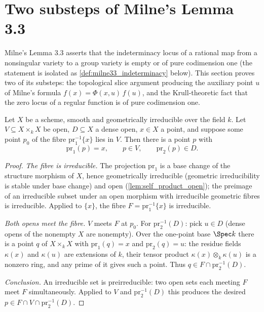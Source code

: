 \section{Two substeps of Milne's Lemma 3.3}
\label{sec:milne33_substeps}

Milne's Lemma 3.3 asserts that the indeterminacy locus of a rational map from a
nonsingular variety to a group variety is empty or of pure codimension one
(the statement is isolated as \ref{def:milne33_indeterminacy} below). This
section proves two of its substeps: the topological slice argument producing
the auxiliary point \(u\) of Milne's formula \(f(x) = \Phi(x,u)\,f(u)\), and
the Krull-theoretic fact that the zero locus of a regular function is of pure
codimension one.

\begin{theorem}
  \label{thm:fibre_slice_witness}
  \leanok
  Let \(X\) be a scheme, smooth and geometrically irreducible over the field
  \(k\). Let \(V \subseteq X \times_k X\) be open, \(D \subseteq X\) a dense
  open, \(x \in X\) a point, and suppose some point \(p_0\) of the fibre
  \(\mathrm{pr}_1^{-1}\{x\}\) lies in \(V\). Then there is a point \(p\) with
  \[
    \mathrm{pr}_1(p) = x, \qquad p \in V, \qquad \mathrm{pr}_2(p) \in D .
  \]
\end{theorem}
\begin{proof}
  \leanok
  \emph{The fibre is irreducible.} The projection \(\mathrm{pr}_1\) is a base
  change of the structure morphism of \(X\), hence geometrically irreducible
  (geometric irreducibility is stable under base change) and open
  (\ref{lem:self_product_open}); the preimage of an irreducible subset under an
  open morphism with irreducible geometric fibres is irreducible. Applied to
  \(\{x\}\), the fibre \(F = \mathrm{pr}_1^{-1}\{x\}\) is irreducible.

  \emph{Both opens meet the fibre.} \(V\) meets \(F\) at \(p_0\). For
  \(\mathrm{pr}_2^{-1}(D)\): pick \(u \in D\) (dense opens of the nonempty
  \(X\) are nonempty). Over the one-point base \(\Spec k\) there is a point
  \(q\) of \(X \times_k X\) with \(\mathrm{pr}_1(q) = x\) and
  \(\mathrm{pr}_2(q) = u\): the residue fields \(\kappa(x)\) and \(\kappa(u)\)
  are extensions of \(k\), their tensor product \(\kappa(x) \otimes_k
  \kappa(u)\) is a nonzero ring, and any prime of it gives such a point. Thus
  \(q \in F \cap \mathrm{pr}_2^{-1}(D)\).

  \emph{Conclusion.} An irreducible set is preirreducible: two open sets each
  meeting \(F\) meet \(F\) simultaneously. Applied to \(V\) and
  \(\mathrm{pr}_2^{-1}(D)\) this produces the desired \(p \in F \cap V \cap
  \mathrm{pr}_2^{-1}(D)\).
\end{proof}

